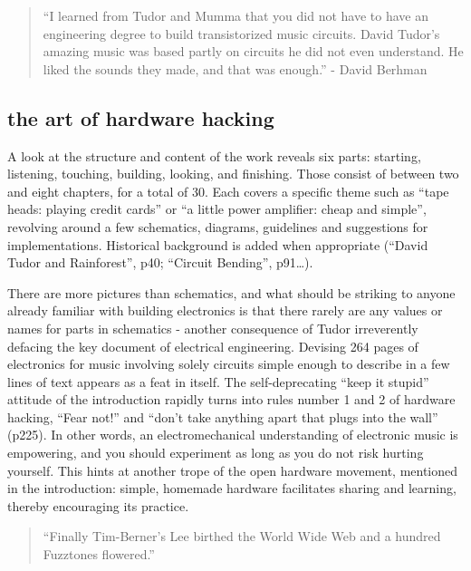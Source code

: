 \begin{quote}
“I learned from Tudor and Mumma that you did not have to have an engineering degree to build transistorized music circuits. David Tudor’s amazing music was based partly on circuits he did not even understand. He liked the sounds they made, and that was enough.” 
- David Berhman \cite[p.ix]{collins2006}  
\end{quote}

\subsection{the art of hardware hacking}

A look at the structure and content of the work reveals six parts: starting, listening, touching, building, looking, and finishing. Those consist of between two and eight chapters, for a total of 30. Each covers a specific theme such as “tape heads: playing credit cards” or “a little power amplifier: cheap and simple”, revolving around a few schematics, diagrams, guidelines and suggestions for implementations. Historical background is added when appropriate (“David Tudor and Rainforest”, p40; “Circuit Bending”, p91…). 

There are more pictures than schematics, and what should be striking to anyone already familiar with building electronics is that there rarely are any values or names for parts in schematics - another consequence of Tudor irreverently defacing the key document of electrical engineering. Devising 264 pages of electronics for music involving solely circuits simple enough to describe in a few lines of text appears as a feat in itself. The self-deprecating “keep it stupid” attitude of the introduction rapidly turns into rules number 1 and 2 of hardware hacking, “Fear not!” and “don’t take anything apart that plugs into the wall” (p225). In other words, an electromechanical understanding of electronic music is empowering, and you should experiment as long as you do not risk hurting yourself. This hints at another trope of the open hardware movement, mentioned in the introduction: simple, homemade hardware facilitates sharing and learning, thereby encouraging its practice.

\begin{quote}

“Finally Tim-Berner’s Lee birthed the World Wide Web and a hundred Fuzztones flowered.” 
	
\cite[p211]{collins2006}

\end{quote}

